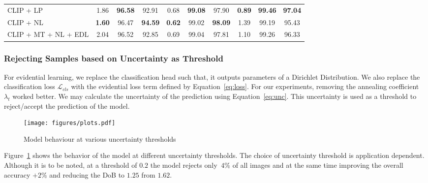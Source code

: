 \documentclass[runningheads]{llncs}
\begin{document}
\begin{table}
{\begin{tabular}{lccccccccc}
\midrule
CLIP + LP            & 1.86                      & \textbf{96.58}               & 92.91                   & 0.68                      & \textbf{99.08}                        & 97.90                   & \textbf{0.89}                      & \textbf{99.46}                        & \textbf{97.04}                    \\
CLIP + NL            & \textbf{1.60}             & 96.47                        & \textbf{94.59}          & \textbf{0.62}                      & 99.02                        & \textbf{98.09}                   & 1.39                      & 99.19                        & 95.43                    \\
CLIP + MT + NL + EDL & 2.04                      & 96.52                        & 92.85                   & 0.69                      & 99.04                        & 97.81                   & 1.10                      & 99.26                        & 96.33                    \\
\bottomrule
\end{tabular}
}
\end{table}

\subsubsection{\textbf{Rejecting Samples based on Uncertainty as Threshold}} For evidential learning, we replace the classification head such that, it outputs parameters of a Dirichlet Distribution. We also replace the classification loss $\mathcal{L}_{cls}$ with the evidential loss term defined by Equation~\ref{eq:loss}. For our experiments, removing the annealing coefficient $\lambda_{t}$ worked better. We may calculate the uncertainty of the prediction using Equation~\ref{eq:unc}. This uncertainty is used as a threshold to reject/accept the prediction of the model.
\begin{figure}[!ht]
    \centering
    \texttt{[image: figures/plots.pdf]}
    \caption{Model behaviour at various uncertainty thresholds}
    \label{fig:reject_option}
\end{figure}

Figure~\ref{fig:reject_option} shows the behavior of the model at different uncertainty thresholds. The choice of uncertainty threshold is application dependent. Although it is to be noted, at a threshold of $0.2$ the model rejects only $~4\%$ of all images and at the same time improving the overall accuracy $+2\%$ and reducing the DoB to $1.25$ from $1.62$.
\end{document}
